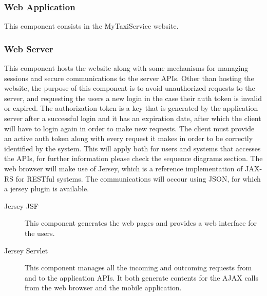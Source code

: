 \documentclass[11pt, a4paper,titlepage]{article}
\newcommand{\productname}{MyTaxiService }
\begin{document}
 \subsubsection{Web Application}
	 This component consists in the \productname website.
 \subsubsection{Web Server}
	 This component hosts the website along with some mechanisms for managing sessions and secure communications to the server APIs. Other than hosting the website, the purpose of this component is to avoid unauthorized requests to the server, and requesting the users a new login in the case their auth token is invalid or expired.\newline
	 The authorization token is a key that is generated by the application server after a successful login and it has an expiration date, after which the client will have to login again in order to make new requests.
	 The client must provide an active auth token along with every request it makes in order to be correctly identified by the system.
	  This will apply both for users and systems that accesses the APIs, for further information please check the sequence diagrams section. 
	  The web browser will make use of Jersey, which is a reference implementation of JAX-RS for RESTful systems. The communications will occour using JSON, for which a jersey plugin is available.
	 \begin{description}
	 	\item[Jersey JSF] This component generates the web pages and provides a web interface for the users.
	 	\item[Jersey Servlet]  This component manages all the incoming and outcoming requests from and to the application APIs. It both generate contents for the AJAX calls from the web browser and the mobile application.
	 \end{description}
	 
\end{document}
